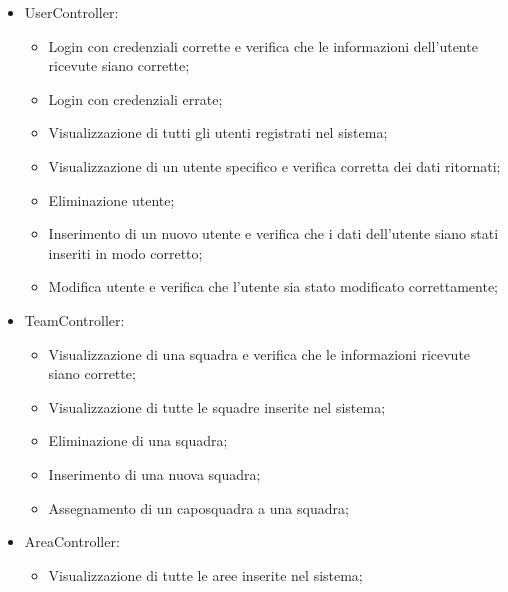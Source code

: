\begin{itemize}
	\item UserController:
	\begin{itemize}
		\item Login con credenziali corrette e verifica che le informazioni dell'utente ricevute siano corrette;
		\item Login con credenziali errate;
		\item Visualizzazione di tutti gli utenti registrati nel sistema;
		\item Visualizzazione di un utente specifico e verifica corretta dei dati ritornati;
		\item Eliminazione utente;
		\item Inserimento di un nuovo utente e verifica che i dati dell'utente siano stati inseriti in modo corretto;
		\item Modifica utente e verifica che l'utente sia stato modificato correttamente;
	\end{itemize}
	\item TeamController:
	\begin{itemize}
		\item Visualizzazione di una squadra e verifica che le informazioni ricevute siano corrette;
		\item Visualizzazione di tutte le squadre inserite nel sistema;
		\item Eliminazione di una squadra;
		\item Inserimento di una nuova squadra;
		\item Assegnamento di un caposquadra a una squadra;
	\end{itemize}
	\item AreaController:
	\begin{itemize}
		\item Visualizzazione di tutte le aree inserite nel sistema;
	\end{itemize}


\end{itemize}
